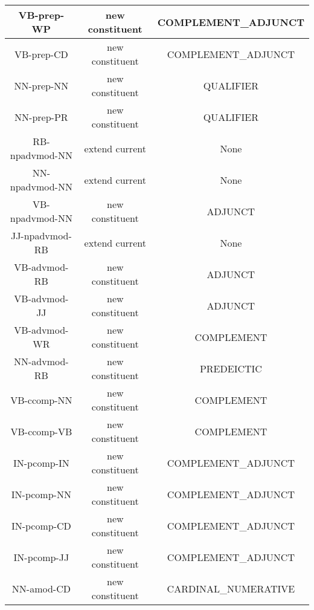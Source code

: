 \begin{table}[!ht]
{\begin{tabular}{|c|c|c|}
            VB-prep-WP            & new constituent             & COMPLEMENT\_ADJUNCT     \\ \hline
            VB-prep-CD            & new constituent             & COMPLEMENT\_ADJUNCT     \\ \hline
            NN-prep-NN            & new constituent             & QUALIFIER               \\ \hline
            NN-prep-PR            & new constituent             & QUALIFIER               \\ \hline
            RB-npadvmod-NN        & extend current              & None                    \\ \hline
            NN-npadvmod-NN        & extend current              & None                    \\ \hline
            VB-npadvmod-NN        & new constituent             & ADJUNCT                 \\ \hline
            JJ-npadvmod-RB        & extend current              & None                    \\ \hline
            VB-advmod-RB          & new constituent             & ADJUNCT                 \\ \hline
            VB-advmod-JJ          & new constituent             & ADJUNCT                 \\ \hline
            VB-advmod-WR          & new constituent             & COMPLEMENT              \\ \hline
            NN-advmod-RB          & new constituent             & PREDEICTIC              \\ \hline
            VB-ccomp-NN           & new constituent             & COMPLEMENT              \\ \hline
            VB-ccomp-VB           & new constituent             & COMPLEMENT              \\ \hline
            IN-pcomp-IN           & new constituent             & COMPLEMENT\_ADJUNCT     \\ \hline
            IN-pcomp-NN           & new constituent             & COMPLEMENT\_ADJUNCT     \\ \hline
            IN-pcomp-CD           & new constituent             & COMPLEMENT\_ADJUNCT     \\ \hline
            IN-pcomp-JJ           & new constituent             & COMPLEMENT\_ADJUNCT     \\ \hline
            NN-amod-CD            & new constituent             & CARDINAL\_NUMERATIVE    \\ \hline

\end{tabular}}
\end{table}
